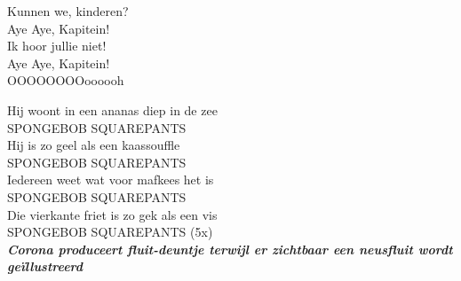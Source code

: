 Kunnen we, kinderen?\\
Aye Aye, Kapitein!\\
Ik hoor jullie niet!\\
Aye Aye, Kapitein!\\
OOOOOOOOoooooh

Hij woont in een ananas diep in de zee\\
SPONGEBOB SQUAREPANTS\\
Hij is zo geel als een kaassouffle\\
SPONGEBOB SQUAREPANTS\\
Iedereen weet wat voor mafkees het is\\
SPONGEBOB SQUAREPANTS\\
Die vierkante friet is zo gek als een vis\\
SPONGEBOB SQUAREPANTS (5x)\\

\textbf{\textit{Corona produceert fluit-deuntje terwijl er zichtbaar een neusfluit wordt geïllustreerd}}